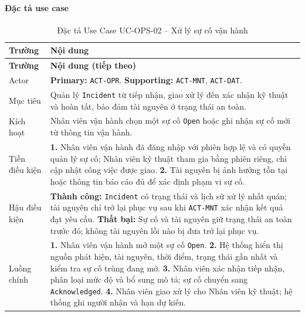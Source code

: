 \paragraph{Đặc tả use case}
\small
\begin{longtable}{|L{26mm}|L{118mm}|}
  \caption{Đặc tả Use Case UC-OPS-02 -- Xử lý sự cố vận hành}\label{tab:spec-UC-OPS-02}\\
  \hline
  \centering\arraybackslash\textbf{Trường} & \centering\arraybackslash\textbf{Nội dung}\\
  \hline
  \endfirsthead
  \hline
  \centering\arraybackslash\textbf{Trường} & \centering\arraybackslash\textbf{Nội dung (tiếp theo)}\\
  \hline
  \endhead
  Actor & \textbf{Primary:} \texttt{ACT-OPR}. \textbf{Supporting:} \texttt{ACT-MNT}, \texttt{ACT-DAT}.\\\hline
  Mục tiêu & Quản lý \texttt{Incident} từ tiếp nhận, giao xử lý đến xác nhận kỹ thuật và hoàn tất, bảo đảm tài nguyên ở trạng thái an toàn.\\\hline
  Kích hoạt & Nhân viên vận hành chọn một sự cố \texttt{Open} hoặc ghi nhận sự cố mới từ thông tin vận hành.\\\hline
  Tiền điều kiện &
    \textbf{1.} Nhân viên vận hành đã đăng nhập với phiên hợp lệ và có quyền quản lý sự cố; Nhân viên kỹ thuật tham gia bằng phiên riêng, chỉ cập nhật công việc được giao.\newline
    \textbf{2.} Tài nguyên bị ảnh hưởng tồn tại hoặc thông tin báo cáo đủ để xác định phạm vi sự cố.\\\hline
  Hậu điều kiện &
    \textbf{Thành công:} \texttt{Incident} có trạng thái và lịch sử xử lý nhất quán; tài nguyên chỉ trở lại phục vụ sau khi \texttt{ACT-MNT} xác nhận kết quả đạt yêu cầu.\newline
    \textbf{Thất bại:} Sự cố và tài nguyên giữ trạng thái an toàn trước đó; không tài nguyên lỗi nào bị đưa trở lại phục vụ.\\\hline
  Luồng chính &
    \textbf{1.} Nhân viên vận hành mở một sự cố \texttt{Open}.\newline
    \textbf{2.} Hệ thống hiển thị nguồn phát hiện, tài nguyên, thời điểm, trạng thái gần nhất và kiểm tra sự cố trùng đang mở.\newline
    \textbf{3.} Nhân viên xác nhận tiếp nhận, phân loại mức độ và bổ sung mô tả; sự cố chuyển sang \texttt{Acknowledged}.\newline
    \textbf{4.} Nhân viên giao xử lý cho Nhân viên kỹ thuật; hệ thống ghi người nhận và hạn dự kiến.\newline

\end{longtable}
